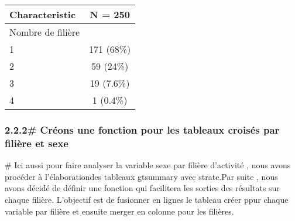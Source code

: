 \documentclass[
]{article}
\begin{document}
\begin{longtable}[]{@{}lc@{}}
\toprule\noalign{}
\textbf{Characteristic} & \textbf{N = 250} \\
\midrule\noalign{}
\endhead
\bottomrule\noalign{}
\endlastfoot
Nombre de filière & \\
1 & 171 (68\%) \\
2 & 59 (24\%) \\
3 & 19 (7.6\%) \\
4 & 1 (0.4\%) \\
\end{longtable}

\hypertarget{cruxe9ons-une-fonction-pour-les-tableaux-croisuxe9s-par-filiuxe8re-et-sexe}{%
\subsubsection{2.2.2\# Créons une fonction pour les tableaux croisés par
filière et
sexe}\label{cruxe9ons-une-fonction-pour-les-tableaux-croisuxe9s-par-filiuxe8re-et-sexe}}

\# Ici aussi pour faire analyser la variable sexe par filière d'activité
, nous avons procéder à l'élaborationdes tableaux gtsummary avec
strate.Par suite , nous avons décidé de définir une fonction qui
facilitera les sorties des résultats sur chaque filière. L'objectif est
de fusionner en lignes le tableau créer ppur chaque variable par filière
et ensuite merger en colonne pour les filières.
\end{document}
